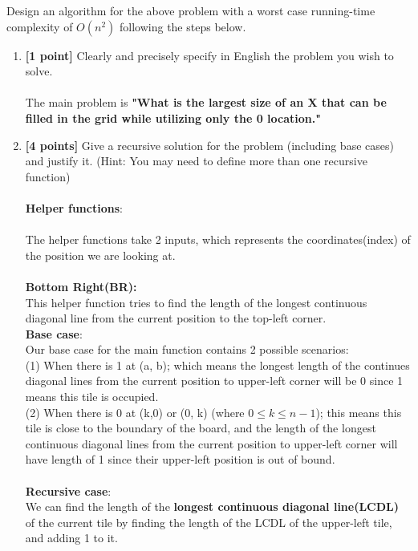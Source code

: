 \documentclass{assignment-373}
\begin{document}
  
  Design an algorithm for the above problem with a worst case
  running-time complexity of $O(n^2)$ following the steps below.
  \begin{enumerate}
  \item \textbf{[1 point]} Clearly and precisely specify in English
    the problem you wish to solve.\\\\
    The main problem is {\bf "What is the largest size of an X that can be filled in the grid while utilizing only the 0 location."}
    
  \item \textbf{[4 points]} Give a recursive solution for the
    problem (including base cases) and justify it. (Hint: You may
    need to define more than one recursive function)\\\\
{\bf Helper functions}:\\
\\
\phantom{=} \phantom{=} The helper functions take 2 inputs, which represents the coordinates(index) of the position we are looking at.\\
\\
\phantom{=} \phantom{=} {\bf Bottom Right(BR):}\\
\phantom{=} \phantom{=} \phantom{=} \phantom{=} This helper function tries to find the length of the longest continuous diagonal line from the current position to the top-left corner.\\
\phantom{=} \phantom{=} {\bf Base case}:\\
\phantom{=} \phantom{=} \phantom{=} \phantom{=} Our base case for the main function contains 2 possible scenarios:\\
\phantom{=} \phantom{=} \phantom{=} \phantom{=} (1) When there is 1 at (a, b); which means the longest length of the continues diagonal lines from the current position to upper-left corner will be 0 since 1 means this tile is occupied.\\
\phantom{=} \phantom{=} \phantom{=} \phantom{=} (2) When there is 0 at (k,0) or (0, k) (where $0\leq k\leq n-1$); this means this tile is close to the boundary of the board, and the length of the longest continuous diagonal lines from the current position to upper-left corner will have length of 1 since their upper-left position is out of bound.\\\\
\phantom{=} \phantom{=} {\bf Recursive case}:\\
\phantom{=} \phantom{=} \phantom{=} \phantom{=} We can find the length of the {\bf longest continuous diagonal line(LCDL)} of the current tile by finding the length of the LCDL of the upper-left tile, and adding 1 to it.\\

\end{enumerate}
\end{document}
